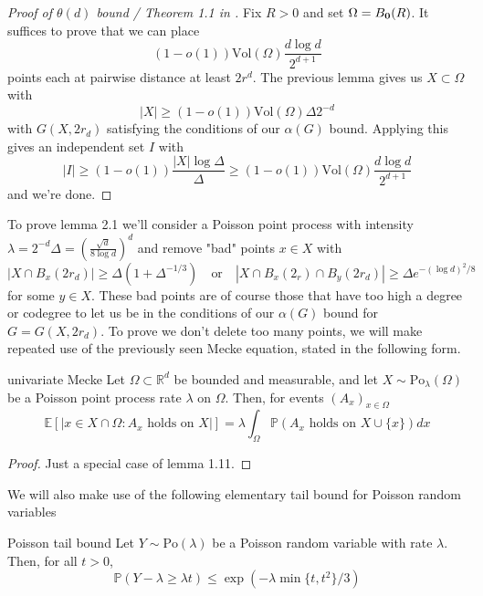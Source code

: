 \documentclass{article}
\begin{document}
\begin{proof}[Proof of $\theta(d)$ bound / Theorem 1.1 in \cite{campos2023}]
    Fix $R > 0$ and set $\Omega = B_{{\bf 0}}(R)$. It suffices to prove that we can place \[(1 - o(1))\text{Vol}(\Omega)
    \frac{d\log d}{2^{d+1}}\] points each at pairwise distance at least $2r^d$. The previous lemma 
    gives us $X \subset \Omega$ with \[|X| \geq (1-o(1))\text{Vol}(\Omega)\Delta 2^{-d}\] with $G(X, 2r_d)$ satisfying 
    the conditions of our $\alpha(G)$ bound. Applying this gives an independent set $I$ with \[|I| \geq (1-o(1))
    \frac{|X|\log \Delta}{\Delta} \geq (1-o(1))\text{Vol}(\Omega)\frac{d\log d}{2^{d+1}}\] and we're done.
\end{proof}

To prove lemma 2.1 we'll consider a Poisson point process with intensity $\lambda=2^{-d}\Delta=
\left(\frac{\sqrt{d}}{8\log d}\right)^d$ and remove "bad" points $x \in X$ with 
\[|X \cap B_x(2r_d)| \geq \Delta(1+\Delta^{-1/3}) \quad \text{or} \quad |X \cap B_x(2_r) \cap B_y(2r_d)| \geq 
\Delta e^{-(\log d)^2/8} \tag{$\heartsuit$}\] for some $y \in X$. These bad points are of course those that have too high a degree 
or codegree to let us be in the conditions of our $\alpha(G)$ bound for $G = G(X, 2r_d)$. To prove we don't delete 
too many points, we will make repeated use of the previously seen Mecke equation, stated in the following form. 

\begin{lemma}[]{univariate Mecke}
    Let $\Omega \subset \mathbb{R}^d$ be bounded and measurable, and let $X \sim \text{Po}_\lambda(\Omega)$ be a
    Poisson point process rate $\lambda$ on $\Omega$. Then, for events $(A_x)_{x \in \Omega}$ 
    \[\mathbb{E}[|x \in X \cap \Omega :  A_x \text{ holds on } X|] = \lambda\int_\Omega \mathbb{P}(A_x \text{ holds on } X \cup \{x\})dx\]
\end{lemma}

\begin{proof}
    Just a special case of lemma 1.11.
\end{proof}

We will also make use of the following elementary tail bound for Poisson random variables

\begin{lemma}[]{Poisson tail bound}
    Let $Y \sim \text{Po}(\lambda)$ be a Poisson random variable with rate $\lambda$. Then, for all $t > 0$,
    \[\mathbb{P}(Y - \lambda \geq \lambda t) \leq \exp(-\lambda\min\{t, t^2\}/3)\]
\end{lemma}
\end{document}
